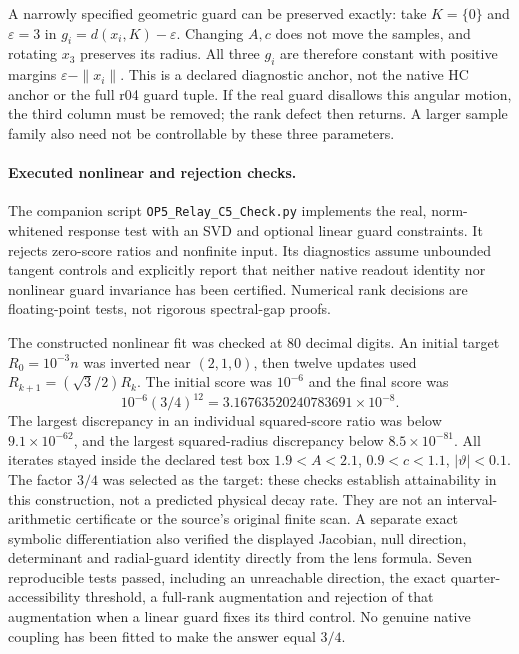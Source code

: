 \documentclass[11pt,a4paper]{article}
\begin{document}
A narrowly specified geometric guard can be preserved exactly:
take $K=\{0\}$ and $\varepsilon=3$ in
$g_i=d(x_i,K)-\varepsilon$. Changing $A,c$ does not move the
samples, and rotating $x_3$ preserves its radius. All three $g_i$
are therefore constant with positive margins
$\varepsilon-\|x_i\|$. This is a declared diagnostic anchor,
not the native HC anchor or the full r04 guard tuple. If the real
guard disallows this angular motion, the third column must be
removed; the rank defect then returns. A larger sample family also
need not be controllable by these three parameters.

\paragraph{Executed nonlinear and rejection checks.}
The companion script \texttt{OP5\_Relay\_C5\_Check.py} implements
the real, norm-whitened response test with an SVD and optional
linear guard constraints. It rejects zero-score ratios and
nonfinite input. Its diagnostics assume unbounded tangent controls
and explicitly report that neither native readout identity nor
nonlinear guard invariance has been certified. Numerical rank
decisions are floating-point tests, not rigorous spectral-gap proofs.

The constructed nonlinear fit was checked at 80 decimal digits.
An initial target $R_0=10^{-3}n$ was inverted near $(2,1,0)$,
then twelve updates used $R_{k+1}=(\sqrt3/2)R_k$. The initial
score was $10^{-6}$ and the final score was
\[
 10^{-6}(3/4)^{12}=3.16763520240783691\times10^{-8}.
\]
The largest discrepancy in an individual squared-score ratio was
below $9.1\times10^{-62}$, and the largest squared-radius discrepancy
below $8.5\times10^{-81}$. All iterates stayed inside the declared
test box $1.9<A<2.1$, $0.9<c<1.1$, $|\vartheta|<0.1$.
The factor $3/4$ was selected as the target: these checks establish
attainability in this construction, not a predicted physical decay rate.
They are not an interval-arithmetic certificate or the source's
original finite scan. A separate exact symbolic differentiation also
verified the displayed Jacobian, null direction, determinant and
radial-guard identity directly from the lens formula.
Seven reproducible tests passed, including an unreachable direction,
the exact quarter-accessibility threshold, a full-rank augmentation
and rejection of that augmentation when a linear guard fixes its
third control. No genuine native coupling has been fitted to make
the answer equal $3/4$.
\end{document}
